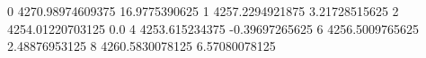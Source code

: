 0 4270.98974609375 16.9775390625
1 4257.2294921875 3.21728515625
2 4254.01220703125 0.0
4 4253.615234375 -0.39697265625
6 4256.5009765625 2.48876953125
8 4260.5830078125 6.57080078125
